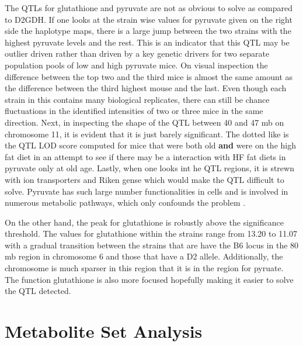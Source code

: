 \documentclass[a4paper,11pt,twoside]{book}
\begin{document}
	The QTLs for glutathione and pyruvate are not as obvious to solve as compared to D2GDH. If one looks at the strain wise values for pyruvate given on the right side the haplotype maps, there is a large jump between the two strains with the highest pyruvate  levels and the rest. This is an indicator that this QTL may be outlier driven rather than driven by a key genetic drivers for two separate population pools of low and high pyruvate mice. On visual inspection the difference between the top two and the third mice is almost the same amount as the difference between the third highest mouse and the last. Even though each strain in this contains many biological replicates, there can still be chance fluctuations in the identified intensities of two or three mice in the same direction. Next, in inspecting the shape of the QTL between 40 and 47 mb on chromosome 11, it is evident that it is just barely significant. The dotted like is the QTL LOD score computed for mice that were both old \textbf{and} were on the high fat diet in an attempt to see if there may be a interaction with HF fat diets in pyruvate only at old age. Lastly, when one looks int he QTL regions, it is strewn with ion transporters and Riken gense which would make the QTL difficult to solve. Pyruvate has such large number functionalities in cells and is involved in numerous metabolic pathways, which only confounds the problem \citep{Voet2011Biochemistry}.
	
	On the other hand, the peak for glutathione is robustly above the significance threshold. The values for glutathione within the strains range from 13.20 to 11.07 with a gradual transition between the strains that are have the B6 locus in the 80 mb region in chromosome 6 and those that have a D2 allele. Additionally, the chromosome is much sparser in this region that it is in the region for pyruate. The function glutathione is also more focused hopefully making it easier to solve the QTL detected.
	
	
	\section{Metabolite Set Analysis}
	
\end{document}
